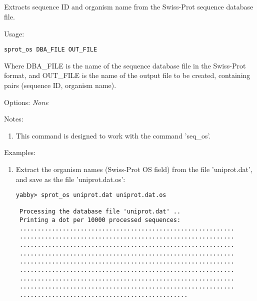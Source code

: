 

\subsection[sprot\_os]{  }



Extracts sequence ID and organism name from the Swiss-Prot
sequence database file.


\begin{description}


\item{Usage:}

{\tt sprot\_os DBA\_FILE OUT\_FILE}

Where DBA\_FILE is the name of the sequence database file
in the Swiss-Prot format, and OUT\_FILE is the name of the
output file to be created, containing pairs (sequence ID,
organism name).


\item{Options:}
{\em None}


\item{Notes:}
\begin{enumerate}
\item This command is designed to work with the command 'seq\_os'.
\end{enumerate}


\item{Examples:}
\begin{enumerate}

\item Extract the organism names (Swiss-Prot OS field) from the
file 'uniprot.dat', and save as the file 'uniprot.dat.os':
\begin{verbatim}
yabby> sprot_os uniprot.dat uniprot.dat.os

 Processing the database file 'uniprot.dat' ..
 Printing a dot per 10000 processed sequences:
 ............................................................
 ............................................................
 ............................................................
 ............................................................
 ............................................................
 ............................................................
 ............................................................
 ............................................................
 ...............................................


\end{verbatim}
\end{enumerate}
\end{description}
